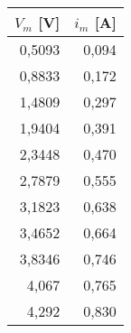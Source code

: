 \begin{tabular}{r|r}
$V_m$ [V]&$i_m$ [A]\\\hline
0,5093&0,094 \\
0,8833&0,172 \\
1,4809&0,297 \\
1,9404&0,391 \\
2,3448&0,470 \\
2,7879&0,555 \\
3,1823&0,638 \\
3,4652&0,664 \\
3,8346&0,746 \\
4,067&0,765 \\
4,292&0,830 \\
\end{tabular}
